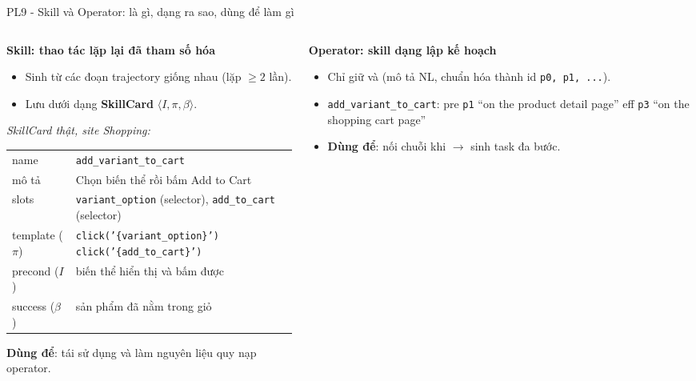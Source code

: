 \begin{frame}{PL9 - Skill và Operator: là gì, dạng ra sao, dùng để làm gì}
  \begin{columns}[onlytextwidth,t]
    \begin{column}{0.49\textwidth}
      \textbf{Skill: thao tác lặp lại đã tham số hóa}
      \begin{itemize}\setlength{\itemsep}{2pt}\scriptsize
        \item Sinh từ  các đoạn trajectory giống nhau (lặp $\ge 2$ lần).
        \item Lưu dưới dạng \textbf{SkillCard} $\langle I, \pi, \beta\rangle$.
      \end{itemize}
      \vspace{0.06cm}
      {\scriptsize\textit{SkillCard thật, site Shopping:}}
      \vspace{0.04cm}
      \tsepc
      \scriptsize
      \begin{tabular}{@{}L{1.5cm} L{4.9cm}@{}}
        \toprule
        name & \texttt{add\_variant\_to\_cart} \\
        mô tả & Chọn biến thể rồi bấm Add to Cart \\
        slots & \texttt{variant\_option} (selector), \texttt{add\_to\_cart} (selector) \\
        template ($\pi$) & \texttt{click('\{variant\_option\}')} \newline \texttt{click('\{add\_to\_cart\}')} \\
        precond ($I$) & biến thể hiển thị và bấm được \\
        success ($\beta$) & sản phẩm đã nằm trong giỏ \\
        \bottomrule
      \end{tabular}
      \vspace{0.06cm}

      {\scriptsize \textbf{Dùng để}: tái sử dụng và làm nguyên liệu quy nạp operator.\par}
    \end{column}

    \hfill
    \begin{column}{0.47\textwidth}
      \textbf{Operator: skill dạng lập kế hoạch}
      \begin{itemize}\setlength{\itemsep}{2pt}\scriptsize
        \item Chỉ giữ  và  (mô tả NL, chuẩn hóa thành id \texttt{p0, p1, ...}).
        \item \texttt{add\_variant\_to\_cart}: \newline
              pre \texttt{p1} ``on the product detail page'' \newline
              eff \texttt{p3} ``on the shopping cart page''
        \item \textbf{Dùng để}: nối chuỗi khi  $\rightarrow$ sinh task đa bước.
      \end{itemize}


\end{column}
\end{columns}
\end{frame}
